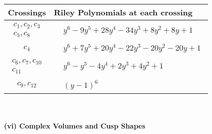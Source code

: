 \documentclass[1p]{elsarticle_modified}
\theoremstyle{definition}
\begin{document}
\begin{tabular}{m{50pt}|m{274pt}}
Crossings & \hspace{64pt}Riley Polynomials at each crossing \\
\hline $$\begin{aligned}c_{1},c_{2},c_{3}\\c_{5},c_{8}\end{aligned}$$&$\begin{aligned}
&y^6-9 y^5+28 y^4-34 y^3+8 y^2+8 y+1
\end{aligned}$\\
\hline $$\begin{aligned}c_{4}\end{aligned}$$&$\begin{aligned}
&y^6+7 y^5+20 y^4-22 y^3-20 y^2-20 y+1
\end{aligned}$\\
\hline $$\begin{aligned}c_{6},c_{7},c_{10}\\c_{11}\end{aligned}$$&$\begin{aligned}
&y^6- y^5-4 y^4+2 y^3+4 y^2+1
\end{aligned}$\\
\hline $$\begin{aligned}c_{9},c_{12}\end{aligned}$$&$\begin{aligned}
&(y-1)^6
\end{aligned}$\\
\hline
\end{tabular}\\~\\
\newpage\flushleft \textbf{(vi) Complex Volumes and Cusp Shapes}
\end{document}
